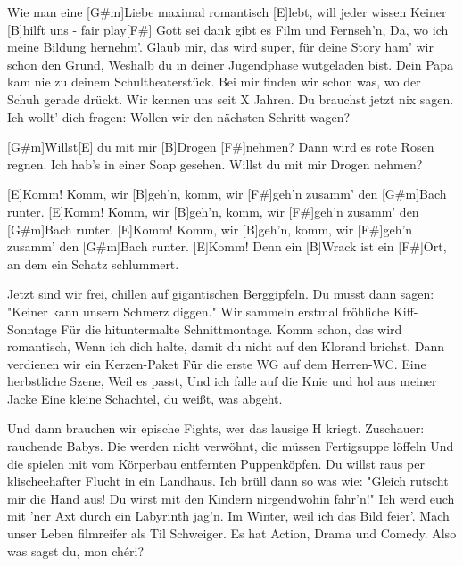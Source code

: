 



\begin{guitar}
	
	Wie man eine [G#m]Liebe maximal romantisch [E]lebt, will jeder wissen
	Keiner [B]hilft uns - fair play[F#]{ }
	Gott sei dank gibt es Film und Fernseh'n,
	Da, wo ich meine Bildung hernehm'.
	Glaub mir, das wird super, für deine Story ham' wir schon den Grund,
	Weshalb du in deiner Jugendphase wutgeladen bist.
	Dein Papa kam nie zu deinem Schultheaterstück.
	Bei mir finden wir schon was, wo der Schuh gerade drückt.
	Wir kennen uns seit X Jahren.
	Du brauchst jetzt nix sagen.
	Ich wollt' dich fragen:
	Wollen wir den nächsten Schritt wagen?
	
	[G#m]Willst[E] du mit mir [B]Drogen [F#]nehmen?
	Dann wird es rote Rosen regnen.
	Ich hab’s in einer Soap gesehen.
	Willst du mit mir Drogen nehmen?
	
	[E]Komm! Komm, wir [B]geh'n, komm, wir [F#]geh'n zusamm' den [G#m]Bach runter.
	[E]Komm! Komm, wir [B]geh'n, komm, wir [F#]geh'n zusamm' den [G#m]Bach runter.
	[E]Komm! Komm, wir [B]geh'n, komm, wir [F#]geh'n zusamm' den [G#m]Bach runter.
	[E]Komm! Denn ein [B]Wrack ist ein [F#]Ort, an dem ein Schatz schlummert.
	
	\pagebreak
	Jetzt sind wir frei, chillen auf gigantischen Berggipfeln.
	Du musst dann sagen: "Keiner kann unsern Schmerz diggen."
	Wir sammeln erstmal fröhliche Kiff-Sonntage
	Für die hituntermalte Schnittmontage.
	Komm schon, das wird romantisch,
	Wenn ich dich halte, damit du nicht auf den Klorand brichst.
	Dann verdienen wir ein Kerzen-Paket
	Für die erste WG auf dem Herren-WC.
	Eine herbstliche Szene,
	Weil es passt,
	Und ich falle auf die Knie und hol aus meiner Jacke
	Eine kleine Schachtel, du weißt, was abgeht.
	
	 
	
	 
	
	Und dann brauchen wir epische Fights, wer das lausige H kriegt.
	Zuschauer: rauchende Babys.
	Die werden nicht verwöhnt, die müssen Fertigsuppe löffeln
	Und die spielen mit vom Körperbau entfernten Puppenköpfen.
	Du willst raus per klischeehafter Flucht in ein Landhaus.
	Ich brüll dann so was wie: "Gleich rutscht mir die Hand aus!
	Du wirst mit den Kindern nirgendwohin fahr'n!"
	Ich werd euch mit 'ner Axt durch ein Labyrinth jag’n.
	Im Winter, weil ich das Bild feier'.
	Mach unser Leben filmreifer als Til Schweiger.
	Es hat Action, Drama und Comedy.
	Also was sagst du, mon chéri?
	

\end{guitar}
